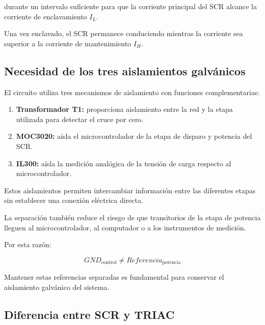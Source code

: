 \documentclass[12pt]{article}
\begin{document}
durante un intervalo suficiente para que la corriente principal del SCR alcance la corriente de enclavamiento $I_L$.

Una vez enclavado, el SCR permanece conduciendo mientras la corriente sea superior a la corriente de mantenimiento $I_H$.


\subsection{Necesidad de los tres aislamientos galvánicos}

El circuito utiliza tres mecanismos de aislamiento con funciones complementarias:

\begin{enumerate}
    \item \textbf{Transformador T1:} proporciona aislamiento entre la red y la etapa utilizada para detectar el cruce por cero.
    
    \item \textbf{MOC3020:} aísla el microcontrolador de la etapa de disparo y potencia del SCR.
    
    \item \textbf{IL300:} aísla la medición analógica de la tensión de carga respecto al microcontrolador.
\end{enumerate}

Estos aislamientos permiten intercambiar información entre las diferentes etapas sin establecer una conexión eléctrica directa.

La separación también reduce el riesgo de que transitorios de la etapa de potencia lleguen al microcontrolador, al computador o a los instrumentos de medición.

Por esta razón:

\[
GND_{\mathrm{control}}
\neq
Referencia_{\mathrm{potencia}}
\]

Mantener estas referencias separadas es fundamental para conservar el aislamiento galvánico del sistema.


\subsection{Diferencia entre SCR y TRIAC}
\end{document}
